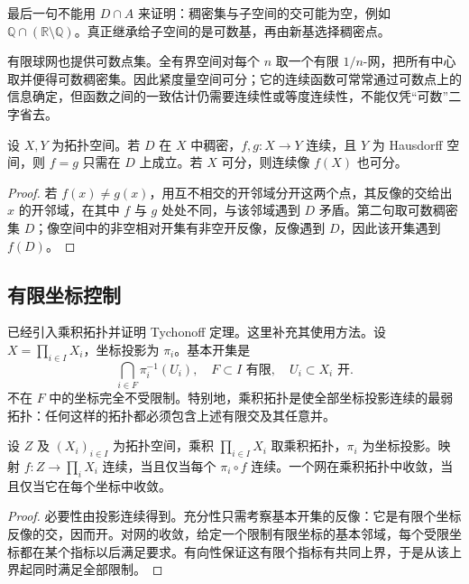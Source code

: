最后一句不能用 \(D\cap A\) 来证明：稠密集与子空间的交可能为空，例如 \(\mathbb Q\cap(\mathbb R\setminus\mathbb Q)\)。真正继承给子空间的是可数基，再由新基选择稠密点。

\ProseParagraphBreak

有限球网也提供可数点集。全有界空间对每个 \(n\) 取一个有限 \(1/n\)-网，把所有中心取并便得可数稠密集。因此紧度量空间可分；它的连续函数可常常通过可数点上的信息确定，但函数之间的一致估计仍需要连续性或等度连续性，不能仅凭“可数”二字省去。

\begin{proposition}\label{b1:prop:app-continuous-dense}
设 \(X,Y\) 为拓扑空间。若 \(D\) 在 \(X\) 中稠密，\(f,g:X\rightarrow Y\) 连续，且 \(Y\) 为 Hausdorff 空间，则 \(f=g\) 只需在 \(D\) 上成立。若 \(X\) 可分，则连续像 \(f(X)\) 也可分。
\end{proposition}
\begin{proof}
若 \(f(x)\ne g(x)\)，用互不相交的开邻域分开这两个点，其反像的交给出 \(x\) 的开邻域，在其中 \(f\) 与 \(g\) 处处不同，与该邻域遇到 \(D\) 矛盾。第二句取可数稠密集 \(D\)；像空间中的非空相对开集有非空开反像，反像遇到 \(D\)，因此该开集遇到 \(f(D)\)。
\end{proof}

\subsection{有限坐标控制}
\label{b1:subsec:A10302}

已经引入乘积拓扑并证明 Tychonoff 定理。这里补充其使用方法。设 \(X=\prod_{i\in I}X_i\)，坐标投影为 \(\pi_i\)。基本开集是
\[
 \bigcap_{i\in F}\pi_i^{-1}(U_i),\quad F\subset I\text{ 有限},\quad U_i\subset X_i\text{ 开}.
\]
不在 \(F\) 中的坐标完全不受限制。特别地，乘积拓扑是使全部坐标投影连续的最弱拓扑：任何这样的拓扑都必须包含上述有限交及其任意并。

\begin{proposition}\label{b1:prop:app-product-universal}
设 \(Z\) 及 \((X_i)_{i\in I}\) 为拓扑空间，乘积 \(\prod_{i\in I}X_i\) 取乘积拓扑，\(\pi_i\) 为坐标投影。映射 \(f:Z\rightarrow\prod_iX_i\) 连续，当且仅当每个 \(\pi_i\circ f\) 连续。一个网在乘积拓扑中收敛，当且仅当它在每个坐标中收敛。
\end{proposition}
\begin{proof}
必要性由投影连续得到。充分性只需考察基本开集的反像：它是有限个坐标反像的交，因而开。对网的收敛，给定一个限制有限坐标的基本邻域，每个受限坐标都在某个指标以后满足要求。有向性保证这有限个指标有共同上界，于是从该上界起同时满足全部限制。
\end{proof}

